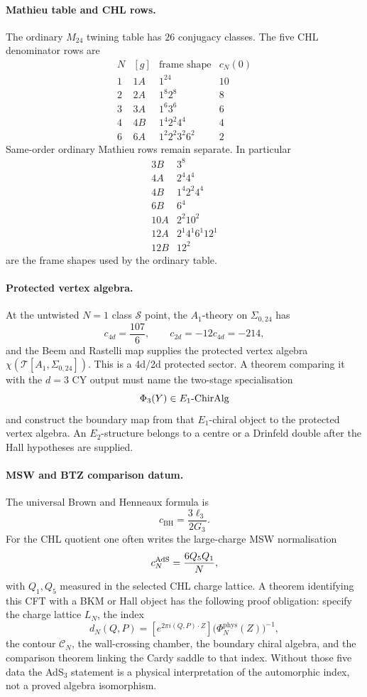 \paragraph{Mathieu table and CHL rows.}
The ordinary \(M_{24}\) twining table has \(26\) conjugacy classes. The
five CHL denominator rows are
\[
\begin{array}{c|c|c|c}
N & [g] & \text{frame shape} & c_N(0)\\ \hline
1 & 1A & 1^{24} & 10\\
2 & 2A & 1^8 2^8 & 8\\
3 & 3A & 1^6 3^6 & 6\\
4 & 4B & 1^4 2^2 4^4 & 4\\
6 & 6A & 1^2 2^2 3^2 6^2 & 2
\end{array}
\]
Same-order ordinary Mathieu rows remain separate. In particular
\[
\begin{array}{c|c}
3B & 3^8\\
4A & 2^4 4^4\\
4B & 1^4 2^2 4^4\\
6B & 6^4\\
10A & 2^2 10^2\\
12A & 2^1 4^1 6^1 12^1\\
12B & 12^2
\end{array}
\]
are the frame shapes used by the ordinary table.

\paragraph{Protected vertex algebra.}
At the untwisted \(N=1\) class \(\mathcal S\) point, the
\(A_1\)-theory on \(\Sigma_{0,24}\) has
\[
  c_{4d}=\frac{107}{6},\qquad
  c_{2d}=-12c_{4d}=-214,
\]
and the Beem and Rastelli map supplies the protected vertex algebra
\(\chi(\mathcal T[A_1,\Sigma_{0,24}])\). This is a 4d/2d protected
sector. A theorem comparing it with the \(d=3\) CY output must name the
two-stage specialisation
\[
  \Phi_3(Y)\in E_1\text{-}\mathrm{ChirAlg}
\]
and construct the boundary map from that \(E_1\)-chiral object to the
protected vertex algebra. An \(E_2\)-structure belongs to a centre or a
Drinfeld double after the Hall hypotheses are supplied.

\paragraph{MSW and BTZ comparison datum.}
The universal Brown and Henneaux formula is
\[
  c_{\mathrm{BH}}=\frac{3\ell_3}{2G_3}.
\]
For the CHL quotient one often writes the large-charge MSW normalisation
\[
  c^{\mathrm{AdS}}_N=\frac{6Q_5Q_1}{N},
\]
with \(Q_1,Q_5\) measured in the selected CHL charge lattice. A theorem
identifying this CFT with a BKM or Hall object has the following proof
obligation: specify the charge lattice \(L_N\), the index
\[
  d_N(Q,P)=[e^{2\pi i(Q,P)\cdot Z}]
  \bigl(\Phi_N^{\mathrm{phys}}(Z)\bigr)^{-1},
\]
the contour \(\mathcal C_N\), the wall-crossing chamber, the boundary
chiral algebra, and the comparison theorem linking the Cardy saddle to
that index. Without those five data the AdS\(_3\) statement is a
physical interpretation of the automorphic index, not a proved algebra
isomorphism.

